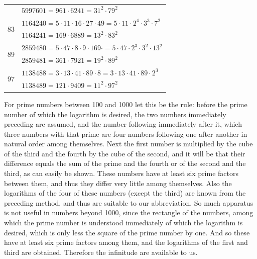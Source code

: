\documentclass[11pt,letterpaper]{book}
\begin{document}
\begin{longtable}{ c l }
                          & $5997601 = 961\cdot 6241 = 31^{2}\cdot 79^{2}$ \\ [1.0em]
\multirow{2}[2]{*}{\Huge 83} & $1164240 = 5\cdot 11\cdot 16\cdot 27\cdot 49 = 5\cdot 11\cdot 2^{4}\cdot 3^{3}\cdot 7^{2}$ \\
                          & $1164241 = 169\cdot 6889 = 13^{2}\cdot 83^{2}$ \\ [1.0em]
\multirow{2}[2]{*}{\Huge 89} & $2859480 = 5\cdot 47\cdot 8\cdot 9\cdot 169\cdot = 5\cdot 47\cdot 2^{3}\cdot 3^{2}\cdot 13^{2}$ \\
                          & $2859481 = 361\cdot 7921 = 19^{2}\cdot 89^{2}$ \\ [1.0em]
\multirow{2}[2]{*}{\Huge 97} & $1138488 = 3\cdot 13\cdot 41\cdot 89\cdot 8 = 3\cdot 13\cdot 41\cdot 89\cdot 2^{3}$ \\
                          & $1138489 = 121\cdot 9409 = 11^{2}\cdot 97^{2}$ \\ [1.0em]
\end{longtable}

For prime numbers between 100 and 1000 let this be the rule: before the prime
number of which the logarithm is desired, the two numbers immediately preceding
are assumed, and the number following immediately after it, which three numbers
with that prime are four numbers following one after another in natural order
among themselves. Next the first number is multiplied by the cube of the third
and the fourth by the cube of the second, and it will be that their difference
equals the sum of the prime and the fourth or of the second and the third, as
can easily be shown. These numbers have at least six prime factors between them,
and thus they differ very little among themselves. Also the logarithms of the
four of these numbers (except the third) are known from the preceding method,
and thus are suitable to our abbreviation. So much apparatus is not useful in
numbers beyond 1000, since the rectangle of the numbers, among which the prime
number is understood immediately of which the logarithm is desired, which is
only less the square of the prime number by one. And so these have at least six
prime factors among them, and the logarithms of the first and third are
obtained. Therefore the infinitude are available to us.

\end{document}
